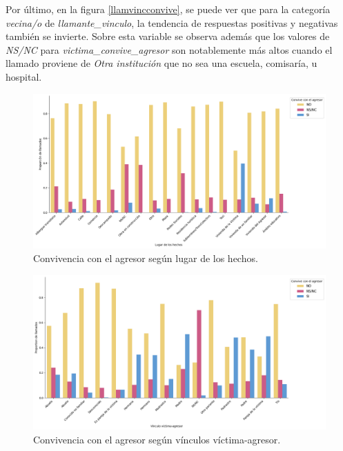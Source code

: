 \documentclass[10 pt]{article}
\begin{document}
Por último, en la figura \ref{llamvincconvive}, se puede ver que para la categoría \textit{vecina/o} de \textit{llamante\_vinculo}, la tendencia de respuestas positivas y negativas también se invierte. Sobre esta variable se observa además que los valores de \textit{NS/NC} para \textit{victima\_convive\_agresor} son notablemente más altos cuando el llamado proviene de \textit{Otra institución} que no sea una escuela, comisaría, u hospital. 


\begin{figure}[H]
\begin{center}
\includegraphics[scale=.5]{images/latex_hecho_lugar_convive.png}
\caption{Convivencia con el agresor según lugar de los hechos.}
\label{hecholugconvive}
\end{center}
\end{figure}
    
\begin{figure}[H]
\begin{center}
\includegraphics[scale=.5]{images/convive_vinc_agresor.png}
\caption{Convivencia con el agresor según vínculos víctima-agresor.}
\label{agrvincconvive}
\end{center}
\end{figure} 
\end{document}
